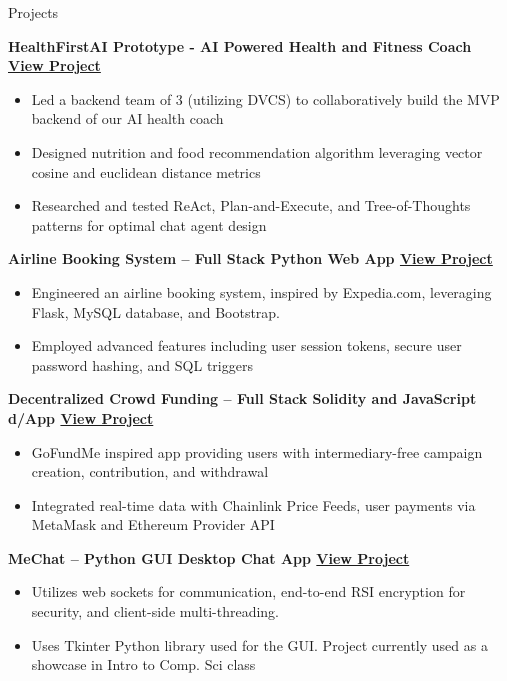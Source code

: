 \documentclass{cv} %
\begin{document}
\begin{rSection}{Projects}

	\textbf{HealthFirstAI Prototype - AI Powered Health and Fitness Coach \href{https://youtu.be/FFocBeiQ8dE}{View Project}}
	\begin{itemize}
		\item Led a backend team of 3 (utilizing DVCS) to collaboratively build the MVP backend of our AI health coach
		\item Designed nutrition and food recommendation algorithm leveraging vector cosine and euclidean distance metrics
		\item Researched and tested ReAct, Plan-and-Execute, and Tree-of-Thoughts patterns for optimal chat agent design
	\end{itemize}

	\textbf{Airline Booking System – Full Stack Python Web App \href{https://github.com/larry-lime/airline-ticket-system}{View Project}}
	\begin{itemize}
		\item Engineered an airline booking system, inspired by Expedia.com, leveraging Flask, MySQL database, and Bootstrap.
		\item Employed advanced features including user session tokens, secure user password hashing, and SQL triggers
	\end{itemize}

	\textbf{Decentralized Crowd Funding – Full Stack Solidity and JavaScript d/App \href{https://lawrencelim.xyz/project/hh-fund-me/}{View Project}}
	\begin{itemize}
		\item GoFundMe inspired app providing users with intermediary-free campaign creation, contribution, and withdrawal
		\item Integrated real-time data with Chainlink Price Feeds, user payments via MetaMask and Ethereum Provider API
	\end{itemize}

	\textbf{MeChat – Python GUI Desktop Chat App \href{https://lawrencelim.xyz/project/mechat/}{View Project}}
	\begin{itemize}
		\item Utilizes web sockets for communication, end-to-end RSI encryption for security, and client-side multi-threading.
		\item Uses Tkinter Python library used for the GUI. Project currently used as a showcase in Intro to Comp. Sci class\\\\
	\end{itemize}

\end{rSection}
\end{document}
